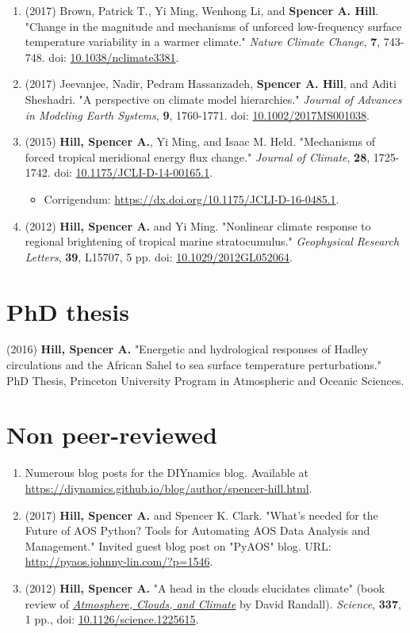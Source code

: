 \documentclass[12pt,letterpaper]{shillcv}
\begin{document}
\begin{enumerate}
\item (2017) Brown, Patrick T., Yi Ming, Wenhong Li, and \textbf{Spencer A. Hill}.  "Change
in the magnitude and mechanisms of unforced low-frequency surface temperature
variability in a warmer climate."  \emph{Nature Climate Change}, \textbf{7}, 743-748.
doi: \href{https://doi.org/10.1038/nclimate3381}{10.1038/nclimate3381}.
\item (2017) Jeevanjee, Nadir, Pedram Hassanzadeh, \textbf{Spencer A. Hill}, and Aditi
Sheshadri.  "A perspective on climate model hierarchies."  \emph{Journal
of Advances in Modeling Earth Systems}, \textbf{9}, 1760-1771.  doi: \href{https://doi.org/10.1002/2017MS001038}{10.1002/2017MS001038}.
\item (2015) \textbf{Hill, Spencer A.}, Yi Ming, and Isaac M. Held.  "Mechanisms of forced
tropical meridional energy flux change."  \emph{Journal of Climate}, \textbf{28},
1725-1742.  doi: \href{http://dx.doi.org/10.1175/JCLI-D-14-00165.1}{10.1175/JCLI-D-14-00165.1}.
\begin{itemize}
\item Corrigendum: \url{https://dx.doi.org/10.1175/JCLI-D-16-0485.1}.
\end{itemize}
\item (2012) \textbf{Hill, Spencer A.} and Yi Ming.  "Nonlinear climate response to regional
brightening of tropical marine stratocumulus."  \emph{Geophysical Research Letters},
\textbf{39}, L15707, 5 pp. doi:
\href{http://dx.doi.org/10.1029/2012GL052064}{10.1029/2012GL052064}.
\end{enumerate}
\section*{PhD thesis}
\label{sec:org62f5a1c}
(2016) \textbf{Hill, Spencer A.} "Energetic and hydrological responses of Hadley
circulations and the African Sahel to sea surface temperature perturbations."
PhD Thesis, Princeton University Program in Atmospheric and Oceanic Sciences.
\section*{Non peer-reviewed}
\label{sec:org9d83d15}
\begin{enumerate}
\item Numerous blog posts for the DIYnamics blog.  Available at
\url{https://diynamics.github.io/blog/author/spencer-hill.html}.
\item (2017) \textbf{Hill, Spencer A.} and Spencer K. Clark.  "What’s needed for the Future
of AOS Python?  Tools for Automating AOS Data Analysis and Management."
Invited guest blog post on "PyAOS" blog.  URL:
\url{http://pyaos.johnny-lin.com/?p=1546}.
\item (2012) \textbf{Hill, Spencer A.}  "A head in the clouds elucidates climate" (book
review of \href{http://press.princeton.edu/titles/9773.html}{\emph{Atmosphere, Clouds, and Climate}} by David Randall). \emph{Science}, \textbf{337},
1 pp., doi: \href{http://dx.doi.org/10.1126/science.1225615}{10.1126/science.1225615}.
\end{enumerate}
\end{document}

